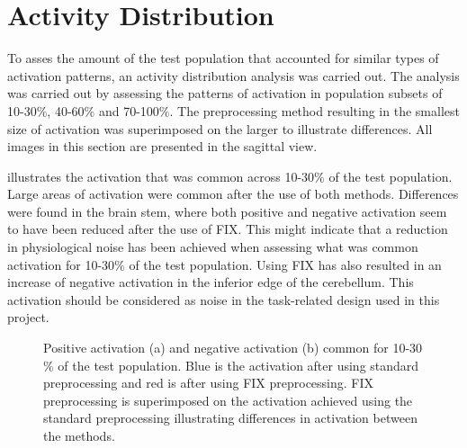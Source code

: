 \section{Activity Distribution}

To asses the amount of the test population that accounted for similar types of activation patterns, an activity distribution analysis was carried out. The analysis was carried out by assessing the patterns of activation in population subsets of 10-30$\percent$, 40-60$\percent$ and 70-100$\percent$. The preprocessing method resulting in the smallest size of activation was superimposed on the larger to illustrate differences. All images in this section are presented in the sagittal view.  

 illustrates the activation that was common across 10-30$\percent$ of the test population. Large areas of activation were common after the use of both methods. Differences were found in the brain stem, where both positive and negative activation seem to have been reduced after the use of FIX. This might indicate that a reduction in physiological noise has been achieved when assessing what was common activation for 10-30$\percent$ of the test population. Using FIX has also resulted in an increase of negative activation in the inferior edge of the cerebellum. This activation should be considered as noise in the task-related design used in this project.

\begin{figure}[H]%
	\centering
	\qquad
	\caption{Positive activation (a) and negative activation (b) common for 10-30$\percent$ of the test population. Blue is the activation after using standard preprocessing and red is after using FIX preprocessing. FIX preprocessing is superimposed on the activation achieved using the standard preprocessing illustrating differences in activation between the methods.}
	\label{fig:10}
\end{figure}

